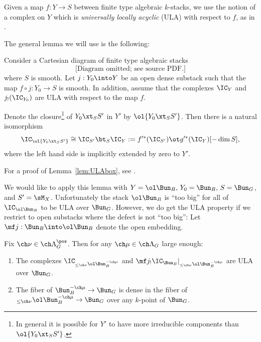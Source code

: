 Given a map $f : Y \to S$ between finite type algebraic $k$-stacks,
we use the notion of a complex on $Y$ which is
\emph{universally locally acyclic} (ULA) with
respect to $f$, as in \cite[D\'efinition 2.12]{SGA4h}.

The general lemma we will use is the following:

\begin{lem}[{\cite[Lemma 7.1.3]{BG}}]
\notready \label{lem:ULAbox}
Consider a Cartesian diagram of finite type algebraic stacks
\[
\text{[Diagram omitted; see source PDF.]}
\]
where $S$ is smooth.
Let $j : Y_0 \into Y$ be an open dense substack such that
the map $f \circ j : Y_0 \to S$ is smooth.
In addition, assume that the complexes $\IC_Y$ and $j_!(\IC_{Y_0})$
are ULA with respect to the map $f$.

Denote the closure\footnote{In general it is possible for $Y'$ to have more irreducible
components than $\ol{Y_0\xt_{S} S'}$.}
of $Y_0 \xt_S S'$ in $Y'$ by $\ol{Y_0 \xt_S S'}$.
Then there is a natural isomorphism
\[
\IC_{\ol{Y_0 \xt_S S'}} \cong \IC_{S'}\bt_S \IC_{Y}  :=
f'^*(\IC_{S'})\ot g'^*(\IC_Y) [-\dim S],
\]
where the left hand side is implicitly extended by zero to $Y'$.
\end{lem}
For a proof of Lemma~\ref{lem:ULAbox}, see \cite{Wang:ULA}.



We would like to apply this lemma with $Y = \ol\Bun_B, \, Y_0 = \Bun_B,\,
S = \Bun_G$, and $S' = \sM_X$. Unfortunately the stack $\ol\Bun_B$ is
``too big'' for all of $\IC_{\ol\Bun_B}$ to be ULA over $\Bun_G$.
However, we do get the ULA property if we restrict to open substacks
where the defect is not ``too big'':
Let $\mf j : \Bun_B \into \ol\Bun_B$ denote the open embedding.

\begin{prop}
\notready
\label{prop:ULA}
Fix $\ch\nu \in \ch\Lambda^\pos_G$. Then for any $\ch\mu \in \ch\Lambda_G$
large enough:
\begin{enumerate}
\item The complexes $\IC_{_{\le \ch\nu}\ol\Bun^{-\ch\mu}_B}$ and
$\mf j_! \IC_{\Bun_B}|_{_{\le \ch\nu}\ol\Bun^{-\ch\mu}_B}$ are
ULA over $\Bun_G$.
\item The fiber of $\Bun^{-\ch\mu}_B \to \Bun_G$ is dense in the
fiber of $_{\le\ch\nu}\ol\Bun^{-\ch\mu}_B \to \Bun_G$ over any $k$-point of $\Bun_G$.
\end{enumerate}
\end{prop}

